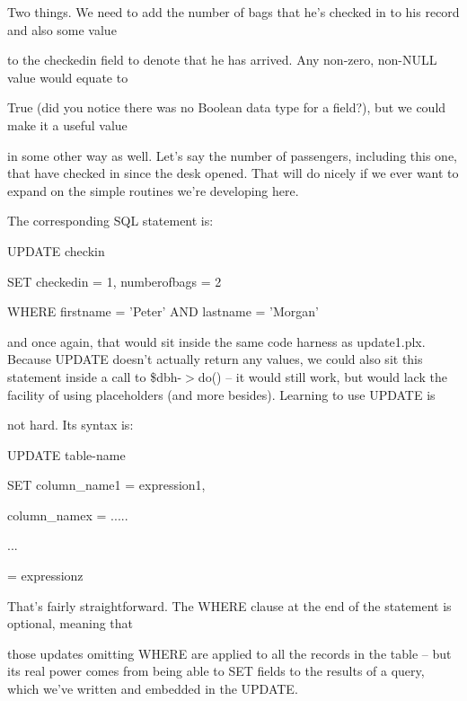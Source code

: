 \documentclass[a4paper,11pt]{book}
\begin{document}
\noindent 

\noindent 

\noindent Two things. We need to add the number of bags that he's checked in to his record and also some value

\noindent to the checkedin field to denote that he has arrived. Any non-zero, non-NULL value would equate to

\noindent True (did you notice there was no Boolean data type for a field?), but we could make it a useful value

\noindent in some other way as well. Let's say the number of passengers, including this one, that have checked in since the desk opened. That will do nicely if we ever want to expand on the simple routines we're developing here.

\noindent 

\noindent The corresponding SQL statement is:

\noindent 

\noindent UPDATE checkin

\noindent SET checkedin = 1, numberofbags = 2

\noindent WHERE  firstname = 'Peter' AND lastname = 'Morgan'

\noindent 

\noindent and once again, that would sit inside the same code harness as update1.plx. Because UPDATE doesn't actually return any values, we could also sit this statement inside a call to \$dbh-$>$do() -- it would still work, but would lack the facility of using placeholders (and more besides). Learning to use UPDATE is

\noindent not hard. Its syntax is:

\noindent 

\noindent UPDATE table-name

\noindent SET column\_name1 = expression1,

\noindent column\_namex = .....

\noindent ...

\noindent = expressionz


\noindent 

\noindent That's fairly straightforward. The WHERE clause at the end of the statement is optional, meaning that

\noindent those updates omitting WHERE are applied to all the records in the table -- but its real power comes from being able to SET fields to the results of a query, which we've written and embedded in the UPDATE.
\end{document}
